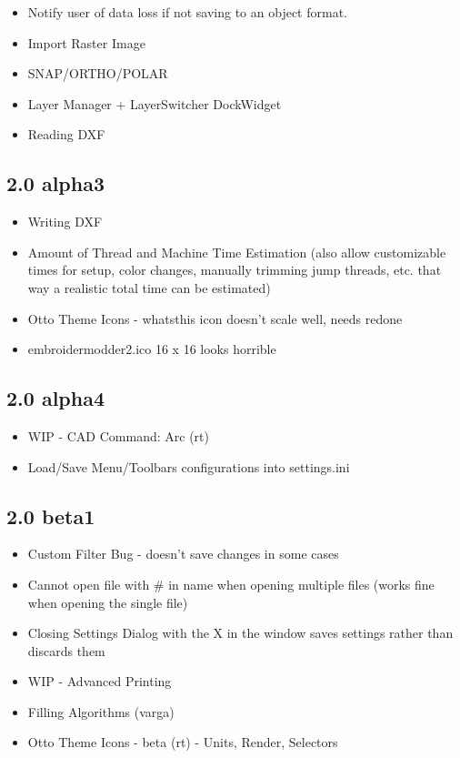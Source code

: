 \documentclass[11pt]{report}
\begin{document}
\begin{itemize}
\item Notify user of data loss if not saving to an object format.
\item Import Raster Image
\item SNAP/ORTHO/POLAR
\item Layer Manager + LayerSwitcher DockWidget
\item Reading DXF
\end{itemize}

\subsection{2.0 alpha3}

\begin{itemize}
\item Writing DXF
\item Amount of Thread and Machine Time Estimation (also allow customizable times for setup, color changes, manually trimming jump threads, etc. that way a realistic total time can be estimated)
\item Otto Theme Icons - whatsthis icon doesn't scale well, needs redone
\item embroidermodder2.ico 16 x 16 looks horrible
\end{itemize}

\subsection{2.0 alpha4}

\begin{itemize}
\item WIP - CAD Command: Arc (rt)
\item Load/Save Menu/Toolbars configurations into settings.ini
\end{itemize}

\subsection{2.0 beta1}

\begin{itemize}
\item Custom Filter Bug - doesn't save changes in some cases
\item Cannot open file with \# in name when opening multiple files (works fine when opening the single file)
\item Closing Settings Dialog with the X in the window saves settings rather than discards them
\item WIP - Advanced Printing
\item Filling Algorithms (varga)
\item Otto Theme Icons - beta (rt) - Units, Render, Selectors
\end{itemize}
\end{document}
